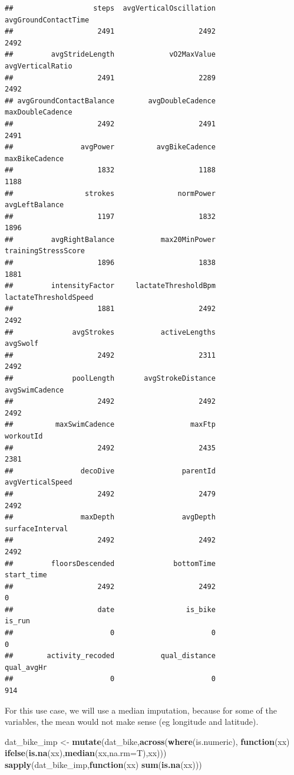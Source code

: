 \documentclass[
]{book}
\newenvironment{Shaded}{\begin{snugshade}}{\end{snugshade}}
\newcommand{\ControlFlowTok}[1]{\textcolor[rgb]{0.13,0.29,0.53}{\textbf{#1}}}
\newcommand{\DataTypeTok}[1]{\textcolor[rgb]{0.13,0.29,0.53}{#1}}
\newcommand{\KeywordTok}[1]{\textcolor[rgb]{0.13,0.29,0.53}{\textbf{#1}}}
\newcommand{\NormalTok}[1]{#1}
\newcommand{\StringTok}[1]{\textcolor[rgb]{0.31,0.60,0.02}{#1}}
\begin{document}
\begin{verbatim}
##                   steps  avgVerticalOscillation    avgGroundContactTime 
##                    2491                    2492                    2492 
##         avgStrideLength             vO2MaxValue        avgVerticalRatio 
##                    2491                    2289                    2492 
## avgGroundContactBalance        avgDoubleCadence        maxDoubleCadence 
##                    2492                    2491                    2491 
##                avgPower          avgBikeCadence          maxBikeCadence 
##                    1832                    1188                    1188 
##                 strokes               normPower          avgLeftBalance 
##                    1197                    1832                    1896 
##         avgRightBalance           max20MinPower     trainingStressScore 
##                    1896                    1838                    1881 
##         intensityFactor     lactateThresholdBpm   lactateThresholdSpeed 
##                    1881                    2492                    2492 
##              avgStrokes           activeLengths                avgSwolf 
##                    2492                    2311                    2492 
##              poolLength       avgStrokeDistance          avgSwimCadence 
##                    2492                    2492                    2492 
##          maxSwimCadence                  maxFtp               workoutId 
##                    2492                    2435                    2381 
##                decoDive                parentId        avgVerticalSpeed 
##                    2492                    2479                    2492 
##                maxDepth                avgDepth         surfaceInterval 
##                    2492                    2492                    2492 
##         floorsDescended              bottomTime              start_time 
##                    2492                    2492                       0 
##                    date                 is_bike                  is_run 
##                       0                       0                       0 
##        activity_recoded           qual_distance              qual_avgHr 
##                       0                       0                     914
\end{verbatim}

For this use case, we will use a median imputation, because for some of the variables, the mean would not make sense (eg longitude and latitude).

\begin{Shaded}
\begin{Highlighting}[]
\NormalTok{dat_bike_imp <-}\StringTok{ }\KeywordTok{mutate}\NormalTok{(dat_bike,}\KeywordTok{across}\NormalTok{(}\KeywordTok{where}\NormalTok{(is.numeric),}
                                   \ControlFlowTok{function}\NormalTok{(xx) }\KeywordTok{ifelse}\NormalTok{(}\KeywordTok{is.na}\NormalTok{(xx),}\KeywordTok{median}\NormalTok{(xx,}\DataTypeTok{na.rm=}\NormalTok{T),xx)))}
\KeywordTok{sapply}\NormalTok{(dat_bike_imp,}\ControlFlowTok{function}\NormalTok{(xx) }\KeywordTok{sum}\NormalTok{(}\KeywordTok{is.na}\NormalTok{(xx)))}
\end{Highlighting}
\end{Shaded}
\end{document}
